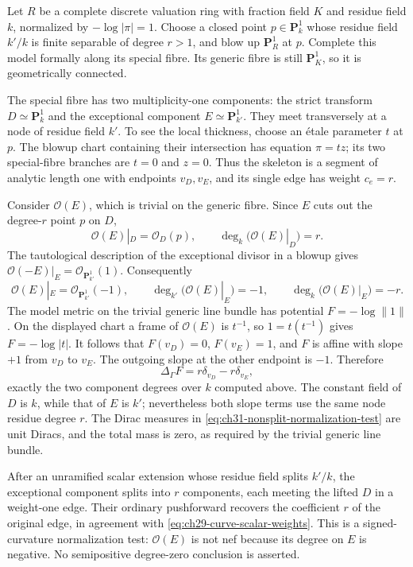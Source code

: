 \begin{example}
\label{ex:ch31-nonsplit-weight-normalization}
Let \(R\) be a complete discrete valuation ring with fraction field \(K\)
and residue field \(k\), normalized by \(-\log|\pi|=1\).
Choose a closed point \(p\in\mathbf P^1_k\) whose residue field
\(k'/k\) is finite separable of degree \(r>1\), and blow up
\(\mathbf P^1_R\) at \(p\).  Complete this model formally along its
special fibre.  Its generic fibre is still \(\mathbf P^1_K\), so it
is geometrically connected.

The special fibre has two multiplicity-one components: the strict
transform \(D\simeq\mathbf P^1_k\) and the exceptional component
\(E\simeq\mathbf P^1_{k'}\).  They meet transversely at a node of residue
field \(k'\).  To see the local thickness, choose an \'{e}tale
parameter \(t\) at \(p\).  The blowup chart containing their
intersection has equation \(\pi=t z\); its two special-fibre
branches are \(t=0\) and \(z=0\).  Thus the skeleton is a segment
of analytic length one with endpoints \(v_D,v_E\), and its single
edge has weight \(c_e=r\).

Consider \(\mathcal O(E)\), which is trivial on the generic fibre.
Since \(E\) cuts out the degree-\(r\) point \(p\) on \(D\),
\[
                 \mathcal O(E)|_D=\mathcal O_D(p),
                 \qquad \deg_k\bigl(\mathcal O(E)|_D\bigr)=r.
\]
The tautological description of the exceptional divisor in a blowup
gives \(\mathcal O(-E)|_E=\mathcal O_{\mathbf P^1_{k'}}(1)\).
Consequently
\[
 \mathcal O(E)|_E=\mathcal O_{\mathbf P^1_{k'}}(-1),
 \qquad
 \deg_{k'}\bigl(\mathcal O(E)|_E\bigr)=-1,
 \qquad
 \deg_k\bigl(\mathcal O(E)|_E\bigr)=-r.
\]
The model metric on the trivial generic line bundle has potential
\(F=-\log\lVert1\rVert\).  On the displayed chart a frame of
\(\mathcal O(E)\) is \(t^{-1}\), so
\(1=t(t^{-1})\) gives \(F=-\log|t|\).
It follows that \(F(v_D)=0\), \(F(v_E)=1\), and \(F\) is affine
with slope \(+1\) from \(v_D\) to \(v_E\).  The outgoing slope
at the other endpoint is \(-1\).  Therefore
\begin{equation}
\label{eq:ch31-nonsplit-normalization-test}
       \Delta_\Gamma F=r\delta_{v_D}-r\delta_{v_E},
\end{equation}
exactly the two component degrees over \(k\) computed above.
The constant field of \(D\) is \(k\), while that of \(E\) is \(k'\);
nevertheless both slope terms use the same node residue degree \(r\).
The Dirac measures in \eqref{eq:ch31-nonsplit-normalization-test}
are unit Diracs, and the total mass is zero, as required by the
trivial generic line bundle.

After an unramified scalar extension whose residue field splits
\(k'/k\), the exceptional component splits into \(r\) components,
each meeting the lifted \(D\) in a weight-one edge.  Their ordinary
pushforward recovers the coefficient \(r\) of the original edge,
in agreement with \eqref{eq:ch29-curve-scalar-weights}.
This is a signed-curvature normalization test:
\(\mathcal O(E)\) is not nef because its degree on \(E\) is negative.
No semipositive degree-zero conclusion is asserted.
\end{example}

